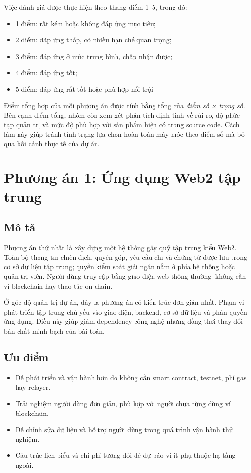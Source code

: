 Việc đánh giá được thực hiện theo thang điểm 1--5, trong đó:

\begin{itemize}
  \item 1 điểm: rất kém hoặc không đáp ứng mục tiêu;
  \item 2 điểm: đáp ứng thấp, có nhiều hạn chế quan trọng;
  \item 3 điểm: đáp ứng ở mức trung bình, chấp nhận được;
  \item 4 điểm: đáp ứng tốt;
  \item 5 điểm: đáp ứng rất tốt hoặc phù hợp nổi trội.
\end{itemize}

Điểm tổng hợp của mỗi phương án được tính bằng tổng của \textit{điểm số × trọng số}. Bên cạnh điểm tổng, nhóm còn xem xét phân tích định tính về rủi ro, độ phức tạp quản trị và mức độ phù hợp với sản phẩm hiện có trong source code. Cách làm này giúp tránh tình trạng lựa chọn hoàn toàn máy móc theo điểm số mà bỏ qua bối cảnh thực tế của dự án.

\section{Phương án 1: Ứng dụng Web2 tập trung}

\subsection{Mô tả}

Phương án thứ nhất là xây dựng một hệ thống gây quỹ tập trung kiểu Web2. Toàn bộ thông tin chiến dịch, quyên góp, yêu cầu chi và chứng từ được lưu trong cơ sở dữ liệu tập trung; quyền kiểm soát giải ngân nằm ở phía hệ thống hoặc quản trị viên. Người dùng truy cập bằng giao diện web thông thường, không cần ví blockchain hay thao tác on-chain.

Ở góc độ quản trị dự án, đây là phương án có kiến trúc đơn giản nhất. Phạm vi phát triển tập trung chủ yếu vào giao diện, backend, cơ sở dữ liệu và phân quyền ứng dụng. Điều này giúp giảm dependency công nghệ nhưng đồng thời thay đổi bản chất minh bạch của bài toán.

\subsection{Ưu điểm}

\begin{itemize}
  \item Dễ phát triển và vận hành hơn do không cần smart contract, testnet, phí gas hay relayer.
  \item Trải nghiệm người dùng đơn giản, phù hợp với người chưa từng dùng ví blockchain.
  \item Dễ chỉnh sửa dữ liệu và hỗ trợ người dùng trong quá trình vận hành thử nghiệm.
  \item Cấu trúc lịch biểu và chi phí tương đối dễ dự báo vì ít phụ thuộc hạ tầng ngoài.
\end{itemize}

